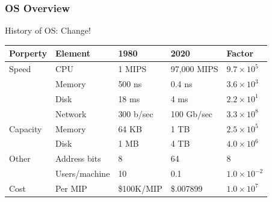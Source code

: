 %
%
\begin{frame}
	\frametitle{OS Overview}

\Large
\centering
History of OS: Change!
\large
\begin{table}[]
	\begin{tabular}{|l|l|l|l|l|}
		\hline
		Porperty & Element             & 1980        & 2020          & Factor       \\ \hline
		Speed    & CPU            & 1 		MIPS    & 97,000 		MIPS & $9.7 \times  10^5 $  \\ \hline
		& Memory         & 500 		ns    & 0.4 		ns      & $ 3.6 \times  10^3 $  \\ \hline
		& Disk           & 18 		ms     & 4 		ms        & $ 2.2 \times   10^1  $ \\ \hline
		& Network        & 300 		b/sec & 100 		Gb/sec  & $ 3.3	\times   10^8 $  \\ \hline
		Capacity & Memory         & 64 		KB     & 1 		TB       & $ 2.5 \times   10^5 $  \\ \hline
		& Disk           & 1 		MB      & 4 		TB        & $ 4.0 \times   10^6 $  \\ \hline
		Other    & Address 		bits & 8           & 64            & $ 8  $           \\ \hline
		& Users/machine  & 10          & 0.1           & $ 1.0 		\times  10^{-2}$  \\ \hline
		Cost     & Per 		MIP      & \$100K/MIP  & \$.007899     & $ 1.0 \times   10^7 $  \\ \hline
	\end{tabular}
\end{table}

\end{frame}


